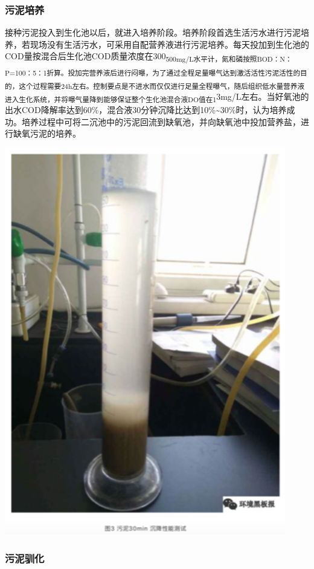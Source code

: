 \documentclass[]{book}
\begin{document}
\subsubsection{污泥培养}

接种污泥投入到生化池以后，就进入培养阶段。培养阶段首选生活污水进行污泥培养，若现场没有生活污水，可采用自配营养液进行污泥培养。每天投加到生化池的COD量按混合后生化池COD质量浓度在300\textsubscript{500mg/L水平计，氮和磷按照BOD：N：P=100：5：1折算。投加完营养液后进行闷曝，为了通过全程足量曝气达到激活活性污泥活性的目的，这个过程需要24h左右。控制要点是不进水而仅仅进行足量全程曝气，随后组织低水量营养液进入生化系统，并将曝气量降到能够保证整个生化池混合液DO值在1}3mg/L左右。当好氧池的出水COD降解率达到60\%，混合液30分钟沉降比达到10\%\textasciitilde{}30\%时，认为培养成功。培养过程中可将二沉池中的污泥回流到缺氧池，并向缺氧池中投加营养盐，进行缺氧污泥的培养。

\includegraphics[width=4.83in]{images/ao3}

\subsubsection{污泥驯化}
\end{document}
